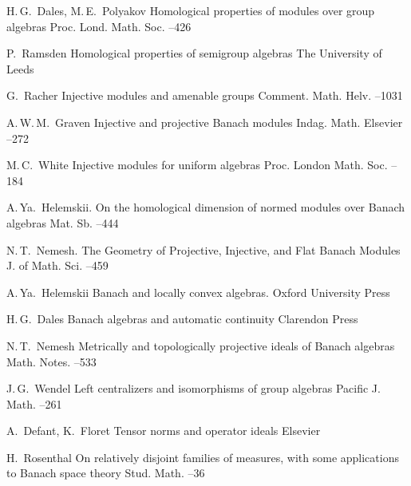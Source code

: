 \documentclass{article}
\theoremstyle{plain}
\theoremstyle{definition}
\begin{document}
\begin{thebibliography}{99}

%
\by H.\,G.~Dales, M.\,E.~Polyakov 
\paper Homological properties of modules over group algebras
\jour Proc. Lond.  Math. Soc. 
--426

%
\by P.~Ramsden 
\thesis Homological properties of semigroup algebras
\publaddr The University of Leeds 

\by G.~Racher 
\paper Injective modules and amenable groups
\jour Comment. Math. Helv. 
--1031

\by A.\,W.\,M.~Graven 
\paper Injective and projective Banach modules
\jour Indag. Math.
\publ Elsevier 
--272

\by M.\,C.~White
\paper Injective modules for uniform algebras
\jour Proc. London Math. Soc. 
--184

\by A.\,Ya.~Helemskii.
\paper On the homological dimension of normed modules over Banach algebras
\jour Mat. Sb. 
--444

\by N.\,T.~Nemesh. 
\paper The Geometry of Projective, Injective, and Flat Banach Modules
\jour J. of Math. Sci.
--459

\by A.\,Ya.~Helemskii 
\book Banach and locally convex algebras. 
\publ Oxford University Press

\by H.\,G.~Dales 
\book Banach algebras and automatic continuity
\publ Clarendon Press

\by N.\,T.~Nemesh
\paper Metrically and topologically projective ideals of Banach algebras
\jour Math. Notes.
--533

\by J.\,G.~Wendel 
\paper Left centralizers and isomorphisms of group algebras
\jour Pacific J. Math. 
--261

\by A.~Defant, K.~Floret
\book Tensor norms and operator ideals 
\publ Elsevier

\by H.~Rosenthal
\paper On relatively disjoint families of measures, with some applications to Banach space theory
\jour Stud. Math. 
--36


\end{thebibliography}
\end{document}
